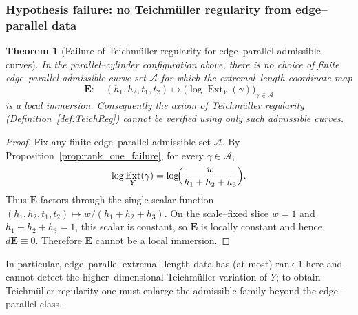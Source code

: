\documentclass[a4paper,12pt]{amsart}
\DeclareMathOperator{\Ext}{Ext}
\theoremstyle{plain}
\newtheorem{theorem}{Theorem}[section]
\theoremstyle{definition}
\begin{document}
\subsubsection{Hypothesis failure: no Teichm\"uller regularity from edge--parallel data}

\begin{theorem}[Failure of Teichm\"uller regularity for edge--parallel admissible curves]\label{thm:bad_example}
In the parallel--cylinder configuration above, there is no choice of finite edge--parallel admissible
curve set \(\mathcal A\) for which the extremal--length coordinate map
\[
\mathbf{E}:\quad (h_1,h_2,t_1,t_2)\longmapsto \bigl(\log\Ext_Y(\gamma)\bigr)_{\gamma\in\mathcal A}
\]
is a local immersion. Consequently the axiom of Teichm\"uller regularity (Definition~\ref{def:TeichReg})
cannot be verified using only such admissible curves.
\end{theorem}

\begin{proof}
Fix any finite edge--parallel admissible set \(\mathcal A\). By Proposition~\ref{prop:rank_one_failure},
for every \(\gamma\in\mathcal A\),
\[
\log\Ext_Y(\gamma)=\log\!\Bigl(\frac{w}{h_1+h_2+h_3}\Bigr).
\]
Thus \(\mathbf{E}\) factors through the single scalar function \((h_1,h_2,t_1,t_2)\mapsto w/(h_1+h_2+h_3)\).
On the scale--fixed slice \(w=1\) and \(h_1+h_2+h_3=1\), this scalar is constant, so \(\mathbf{E}\) is locally
constant and hence \(d\mathbf{E}\equiv 0\). Therefore \(\mathbf{E}\) cannot be a local immersion.
\end{proof}

In particular, edge--parallel extremal--length data has (at most) rank \(1\) here and cannot detect the
higher--dimensional Teichm\"uller variation of \(Y\); to obtain Teichm\"uller regularity one must enlarge the
admissible family beyond the edge--parallel class.
\end{document}
